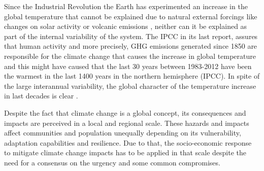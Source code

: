 Since the Industrial Revolution the Earth has experimented an increase in the global temperature that cannot be explained due to natural external forcings like changes on solar activity or volcanic emissions \cite*{Bindoff2013}, neither can it be explained as part of the internal variability of the system. The IPCC in its last report, assures that human activity and more precisely, GHG emissions generated since 1850 are responsible for the climate change that causes the increase in global temperature and this might have caused that the last 30 years between 1983-2012 have been the warmest in the last 1400 years in the northern hemisphere (IPCC). In spite of the large interannual variability, the global character of the temperature increase in last decades is clear \cite*{Stocker2013}.




Despite the fact that climate change is a global concept, its consequences and impacts are perceived in a local and regional scale. These hazards and impacts affect communities and population unequally depending on its vulnerability, adaptation capabilities and resilience. Due to that, the socio-economic response to mitigate climate change impacts has to be applied in that scale despite the need for a consensus on the urgency and some common compromises.


